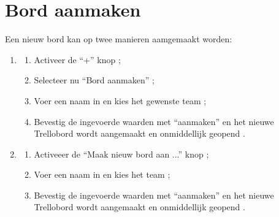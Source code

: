 \section{Bord aanmaken}

Een nieuw bord kan op twee manieren aamgemaakt worden:
\begin{enumerate}
	\item 
		\begin{enumerate}
			\item Activeer de ``+'' knop ;
			\item Selecteer nu ``Bord aanmaken'' ;
			\item Voer een naam in en kies het gewenste team ;
			\item Bevestig de ingevoerde waarden met ``aanmaken'' en het nieuwe Trellobord wordt aangemaakt en onmiddellijk geopend .
		\end{enumerate}
	\item 
		\begin{enumerate}
			\item Activeeer de ``Maak nieuw bord aan ...'' knop ;
			\item Voer een naam in en kies het team ;
			\item Bevestig de ingevoerde waarden met ``aanmaken'' en het nieuwe Trellobord wordt aangemaakt en onmiddellijk geopend .
		\end{enumerate}
\end{enumerate}
\hfil

